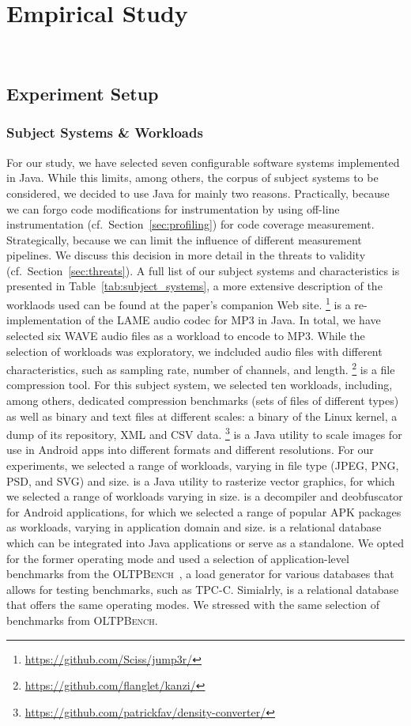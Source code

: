 \section{Empirical Study}~\label{sec:study}

{
	\color{black}
	\subsection{Experiment Setup}
	\subsubsection{Subject Systems \& Workloads}
	For our study, we have selected seven configurable software systems implemented in Java. While this limits, among others, the corpus of subject systems to be considered, we decided to use Java for mainly two reasons. Practically, because we can forgo code modifications for instrumentation by using off-line instrumentation (cf.~Section~\ref{sec:profiling}) for code coverage measurement. Strategically, because we can limit the influence of different measurement pipelines. We discuss this decision in more detail in the threats to validity (cf.~Section~\ref{sec:threats}). A full list of our subject systems and characteristics is presented in Table~\ref{tab:subject_systems}, a more extensive description of the worklaods used can be found at the paper's companion Web site.
	\jumper\footnote{\url{https://github.com/Sciss/jump3r/}} is a re-implementation of the LAME audio codec for MP3 in Java. In total, we have selected {\color{red}six} WAVE audio files as a workload to encode to MP3. While the selection of workloads was exploratory, we indcluded audio files with different characteristics, such as sampling rate, number of channels, and length. 
	\kanzi\footnote{\url{https://github.com/flanglet/kanzi/}} is a file compression tool. For this subject system, we selected {\color{red}ten} workloads, including, among others, dedicated compression benchmarks (sets of files of different types) as well as binary and text files at different scales: a binary of the Linux kernel, a dump of its repository, XML and CSV data. 
	\dconvert\footnote{\url{https://github.com/patrickfav/density-converter/}} is a Java utility to scale images for use in Android apps into different formats and different resolutions. For our experiments, we selected a range of workloads, varying in file type (JPEG, PNG, PSD, and SVG) and size.
	\batik is a Java utility to rasterize vector graphics, for which we selected a range of workloads varying in size.
	\jadx is a decompiler and deobfuscator for Android applications, for which we selected a range of popular APK packages as workloads, varying in application domain and size.
	\htwo is a relational database which can be integrated into Java applications or serve as a standalone. We opted for the former operating mode and used a selection of application-level benchmarks from the \textsc{OLTPBench}~\cite{difallah_oltp_2013}, a load generator for various databases that allows for testing benchmarks, such as TPC-C. Simialrly, \hsqldb is a relational database that offers the same operating modes. We stressed \hsqldb with the same selection of benchmarks from \textsc{OLTPBench}.
	
}
